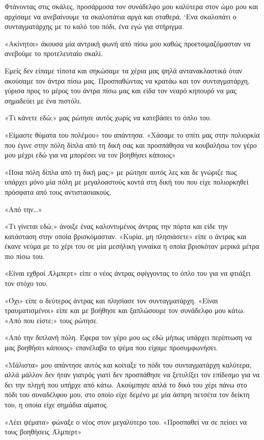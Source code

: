 \documentclass[12pt,twoside, openany]{book}
\begin{document}
Φτάνοντας στις σκάλες, προσάρμοσα τον συνάδελφο μου καλύτερα στον ώμο μου και αρχίσαμε να ανεβαίνουμε τα σκαλοπάτια αργά και σταθερά. ‘Ενα σκαλοπάτι ο συνταγματάρχης με το καλό του πόδι, ένα εγώ για στήριγμα.

«Ακίνητοι» άκουσα μία αντρική φωνή από πίσω μου καθώς προετοιμαζόμασταν να ανεβούμε το προτελευταίο σκαλί.

Εμείς δεν είπαμε τίποτα και σηκώσαμε τα χέρια μας ψηλά αντανακλαστικά όταν ακούσαμε τον άντρα πίσω μας. Προσπαθώντας να κρατάω και τον συνταγματάρχη, γύρισα προς το μέρος του άντρα πίσω μας και είδα τον νεαρό κηπουρό να μας σημαδεύει με ένα πιστόλι.

«Τι κάνετε εδώ;» μας ρώτησε αυτός χωρίς να κατεβάσει το όπλο του.

«Είμαστε θύματα του πολέμου» του απάντησα. «Χάσαμε το σπίτι μας στην πολιορκία που έγινε στην πόλη δίπλα από τη δική σας και προσπάθησα να κουβαλήσω τον γέρο μου μέχρι εδώ για να μπορέσει να τον βοηθήσει κάποιος»

«Ποια πόλη δίπλα από τη δική μας;» με ρώτησε αυτός λες και δε γνώριζε πως υπάρχει μόνο μία πόλη με μεγαλοαστούς κοντά στη δική του που είχε πολιορκηθεί πρόσφατα από τους αντιστασιακούς.

«Από την…»

«Τι γίνεται εδώ;» άνοιξε ένας καλοντυμένος άντρας την πόρτα και είδε την κατάσταση στην οποία βρισκόμασταν. «Κυρία, μη πλησιάσετε» είπε ο άντρας και έκανε νεύμα με το χέρι του σε μία μεσήλικη γυναίκα η οποία βρισκόταν μερικά μέτρα πιο πίσω του.

«Είναι εχθροί Άλμπερτ» είπε ο νέος άντρας σφίγγοντας το όπλο του για να φτιάξει τον στόχο του.

«Όχι» είπε ο δεύτερος άντρας και πλησίασε τον συνταγματάρχη. «Είναι τραυματισμένοι» είπε και με βοήθησε και ξαπλώσουμε τον συνάδελφο μου κάτω. «Από που είστε;» τους ρώτησε. 

«Από την διπλανή πόλη. Έφερα τον γέρο μου ως εδώ μήπως υπάρχει περίπτωση να μας βοηθήσει κάποιος» επανέλαβα το ψέμα που είχαμε προσυμφωνήσει.

«Μάλιστα» μου απάντησε αυτός και κοίταξε το πόδι του συνταγματάρχη καλύτερα, αλλά μάλλον δεν ήταν γιατρός γιατί δεν προσπάθησε να ξετυλίξει τον επίδεσμο για να δει την πληγή που υπήρχε από κάτω. Ακούμπησε απλά το δικό του χέρι πάνω στο πόδι του συναδέλφου μου, στο οποίο είχε δεμένο με μία άσπρη πετσέτα τον δείκτη του, η οποία είχε σημάδια αίματος.

«Λέει ψέματα» φώναξε ο νέος στον μεγαλύτερο του. «Προσπαθεί να σε πείσει να τους βοηθήσεις Άλμπερτ»
\end{document}
